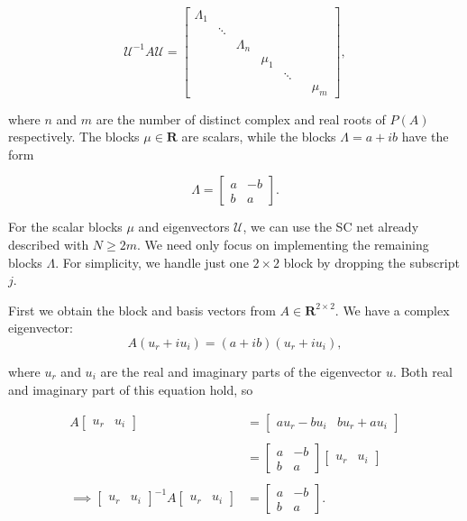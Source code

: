 \begin{itemize}
$$
\mathcal{U}^{-1}A\mathcal{U} = 
\begin{bmatrix}
\Lambda_1 & & & & & 
\\
& \ddots & & & & 
\\
& & \Lambda_n &  & & 
\\
& & & \mu_1 & &
\\
& & & & \ddots &
\\
& & & & & & \mu_m
\end{bmatrix}, 
$$

where $n$ and $m$ are the number of distinct complex and real roots of $P(A)$ respectively. The blocks $\mu \in \mathbf{R}$ are scalars, while the blocks $\Lambda = a + i b$ have the form

$$
\Lambda = 
\begin{bmatrix}
a & -b
\\
b & a
\end{bmatrix}.
$$

For the scalar blocks $\mu$ and eigenvectors $\mathcal{U}$, we can use the SC net already described with $N \geq 2m$. We need only focus on implementing the remaining blocks $\Lambda$. For simplicity, we handle just one $2 \times 2$ block by dropping the subscript $j$.

First we obtain the block and basis vectors from $A \in \mathbf{R}^{2 \times 2}$. We have a complex eigenvector:
$$
A(u_r + i u_i) = (a + ib) (u_r + i u_i), 
$$

where $u_r$ and $u_i$ are the real and imaginary parts of the eigenvector $u$. Both real and imaginary part of this equation hold, so 

\begin{align*}
A 
\begin{bmatrix}
u_r & u_i
\end{bmatrix}
&=
\begin{bmatrix}
a u_r - b u_i  & b u_r + a u_i
\end{bmatrix}
\\
\\
&=
\begin{bmatrix}
a & -b
\\
b & a
\end{bmatrix}
\begin{bmatrix}
u_r & u_i
\end{bmatrix}
\\
\\
\implies
\begin{bmatrix}
u_r & u_i
\end{bmatrix}^{-1}
A  
\begin{bmatrix}
u_r & u_i
\end{bmatrix}
&= \begin{bmatrix}
a & -b
\\
b & a
\end{bmatrix}.
\end{align*}


\end{itemize}
